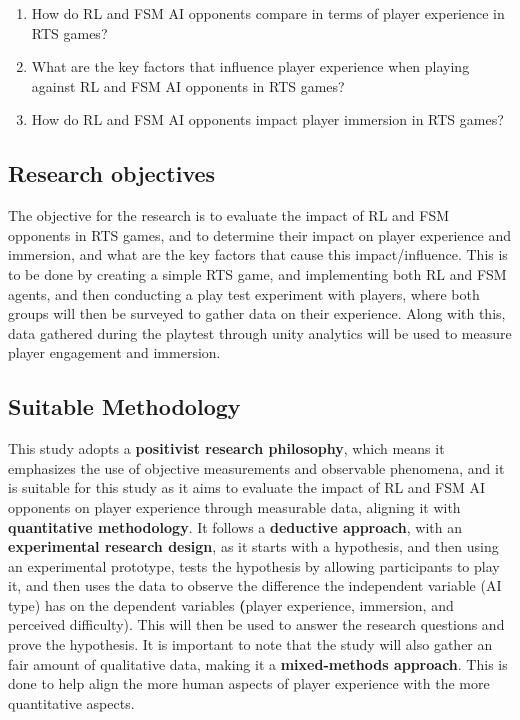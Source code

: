 \documentclass[conference]{IEEEtran}
\begin{document}
\begin{enumerate}
	\item How do RL and FSM AI opponents compare in terms of player experience in RTS games?
	\item What are the key factors that influence player experience when playing against RL and FSM AI opponents in RTS games?
	\item How do RL and FSM AI opponents impact player immersion in RTS games?
\end{enumerate}

\subsection{Research objectives}

The objective for the research is to evaluate the impact of RL and FSM opponents in RTS games, and to determine their impact on player experience and immersion,
and what are the key factors that cause this impact/influence. This is to be done by creating a simple RTS game, and implementing both RL and FSM agents,
and then conducting a play test experiment with players, where both groups will then be surveyed to gather data on their experience. Along with this,
data gathered during the playtest through unity analytics will be used to measure player engagement and immersion.

\subsection{Suitable Methodology}

This study adopts a \textbf{positivist research philosophy}, which means it emphasizes the use of objective measurements and observable phenomena, and it is suitable for this study as it aims
to evaluate the impact of RL and FSM AI opponents on player experience through measurable data, aligning it with \textbf{quantitative methodology}. It follows a \textbf{deductive approach}, with an \textbf{experimental research design},
as it starts with a hypothesis, and then using an experimental prototype, tests the hypothesis by allowing participants to play it, and then uses the data to observe the difference the independent variable (AI type)
has on the dependent variables \textbf(player experience, immersion, and perceived difficulty). This will then be used to answer the research questions and prove the hypothesis. It is important to note that the study
will also gather an fair amount of qualitative data, making it a \textbf{mixed-methods approach}. This is done to help align the more human aspects of player experience with the more quantitative aspects.
\end{document}
